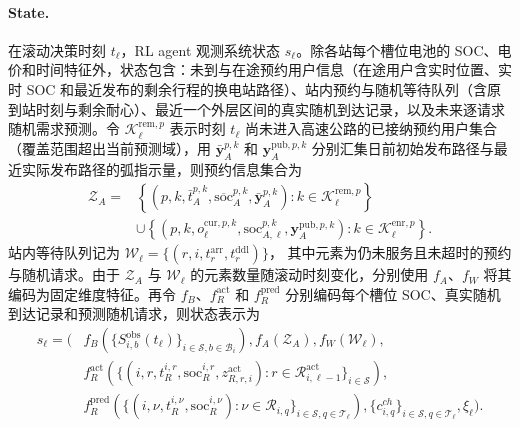 \documentclass[12pt,a4paper,UTF8]{ctexart}
\begin{document}
\paragraph{State.}
在滚动决策时刻 $t_\ell$，RL agent 观测系统状态 $s_\ell$。除各站每个槽位电池的 SOC、电价和时间特征外，状态包含：未到与在途预约用户信息（在途用户含实时位置、实时 SOC 和最近发布的剩余行程的换电站路径）、站内预约与随机等待队列（含原到站时刻与剩余耐心）、最近一个外层区间的真实随机到达记录，以及未来逐请求随机需求预测。令
$\mathcal K_\ell^{\mathrm{rem},p}$ 表示时刻 $t_\ell$ 尚未进入高速公路的已接纳预约用户集合（覆盖范围超出当前预测域），用 $\bar{\mathbf y}_A^{p,k}$ 和 $\mathbf y_A^{\mathrm{pub},p,k}$ 分别汇集日前初始发布路径与最近实际发布路径的弧指示量，则预约信息集合为
\begin{equation}
\begin{aligned}
\mathcal Z_{A}
={}&
\left\{
\left(p,k,\bar t_A^{p,k},
\overline{\mathrm{soc}}_A^{p,k},
\bar{\mathbf y}_A^{p,k}\right):
k\in\mathcal K_\ell^{\mathrm{rem},p}
\right\}\\
&\cup
\left\{
\left(p,k,o_\ell^{\mathrm{cur},p,k},\mathrm{soc}_{A,\ell}^{p,k},
\mathbf y_A^{\mathrm{pub},p,k}\right):
k\in\mathcal K_\ell^{\mathrm{enr},p}
\right\}.
\end{aligned}
\label{eq:rl_reservation_information}
\end{equation}
站内等待队列记为
$\mathcal W_\ell=\{(r,i,t_r^{\mathrm{arr}},t_r^{\mathrm{ddl}})\}$，
其中元素为仍未服务且未超时的预约与随机请求。由于 $\mathcal Z_{A}$ 与 $\mathcal W_\ell$ 的元素数量随滚动时刻变化，分别使用 $f_A$、$f_W$ 将其编码为固定维度特征。再令 $f_B$、$f_R^{\mathrm{act}}$ 和 $f_R^{\mathrm{pred}}$ 分别编码每个槽位 SOC、真实随机到达记录和预测随机请求，则状态表示为
\begin{equation}
\begin{aligned}
s_\ell=\Big(&
f_B\!\left(\{S_{i,b}^{\mathrm{obs}}(t_\ell)\}_{i\in\mathcal S,b\in\mathcal B_i}\right),
f_A(\mathcal Z_{A}),
f_W(\mathcal W_\ell),\\
&
f_R^{\mathrm{act}}\!\left(
\{(i,r,t_R^{i,r},\mathrm{soc}_R^{i,r},z_{R,r,i}^{\mathrm{act}}):
r\in\mathcal R_{i,\ell-1}^{\mathrm{act}}\}_{i\in\mathcal S}
\right),\\
&
f_R^{\mathrm{pred}}\!\left(
\{(i,\nu,t_{R}^{i,\nu},\mathrm{soc}_{R}^{i,\nu}):
\nu\in\mathcal R_{i,q}\}_{i\in\mathcal S,q\in\mathcal T_\ell}
\right),
\{c^{ch}_{i,q}\}_{i\in\mathcal S,q\in\mathcal T_\ell},
\xi_\ell
\Big).
\end{aligned}
\label{eq:rl_state}
\end{equation}
\end{document}
